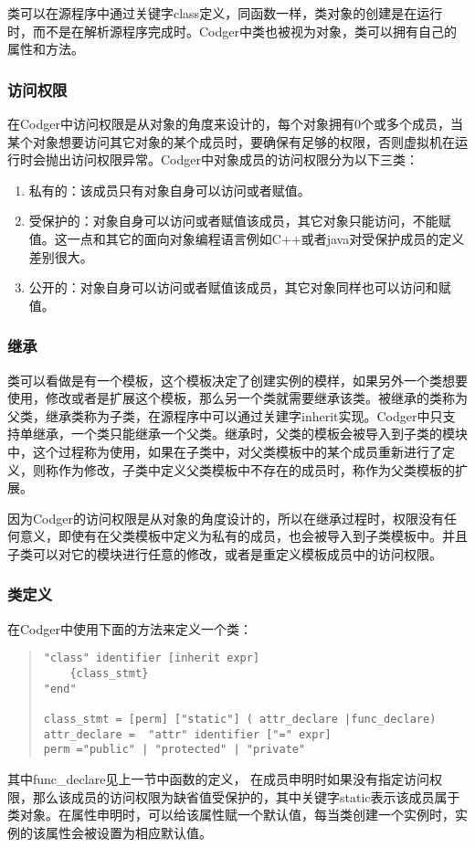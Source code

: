 类可以在源程序中通过关键字class定义，同函数一样，类对象的创建是在运行时，而不是在解析源程序完成时。Codger中类也被视为对象，类可以拥有自己的属性和方法。
\subsubsection{访问权限}
在Codger中访问权限是从对象的角度来设计的，每个对象拥有0个或多个成员，当某个对象想要访问其它对象的某个成员时，要确保有足够的权限，否则虚拟机在运行时会抛出访问权限异常。Codger中对象成员的访问权限分为以下三类：
\begin{enumerate}
\item 私有的：该成员只有对象自身可以访问或者赋值。
\item 受保护的：对象自身可以访问或者赋值该成员，其它对象只能访问，不能赋值。这一点和其它的面向对象编程语言例如C++或者java对受保护成员的定义差别很大。
\item 公开的：对象自身可以访问或者赋值该成员，其它对象同样也可以访问和赋值。
\end{enumerate}

\subsubsection{继承}
类可以看做是有一个模板，这个模板决定了创建实例的模样，如果另外一个类想要使用，修改或者是扩展这个模板，那么另一个类就需要继承该类。被继承的类称为父类，继承类称为子类，在源程序中可以通过关建字inherit实现。Codger中只支持单继承，一个类只能继承一个父类。继承时，父类的模板会被导入到子类的模块中，这个过程称为使用，如果在子类中，对父类模板中的某个成员重新进行了定义，则称作为修改，子类中定义父类模板中不存在的成员时，称作为父类模板的扩展。

因为Codger的访问权限是从对象的角度设计的，所以在继承过程时，权限没有任何意义，即使有在父类模板中定义为私有的成员，也会被导入到子类模板中。并且子类可以对它的模块进行任意的修改，或者是重定义模板成员中的访问权限。

\subsubsection{类定义}
在Codger中使用下面的方法来定义一个类：
\begin{quote}
\begin{verbatim}
"class" identifier [inherit expr]
    {class_stmt}
"end"

class_stmt = [perm] ["static"] ( attr_declare |func_declare)
attr_declare =  "attr" identifier ["=" expr] 
perm ="public" | "protected" | "private"
\end{verbatim}
\end{quote}
其中func\_declare见上一节中函数的定义， 在成员申明时如果没有指定访问权限，那么该成员的访问权限为缺省值受保护的，其中关键字static表示该成员属于类对象。在属性申明时，可以给该属性赋一个默认值，每当类创建一个实例时，实例的该属性会被设置为相应默认值。

